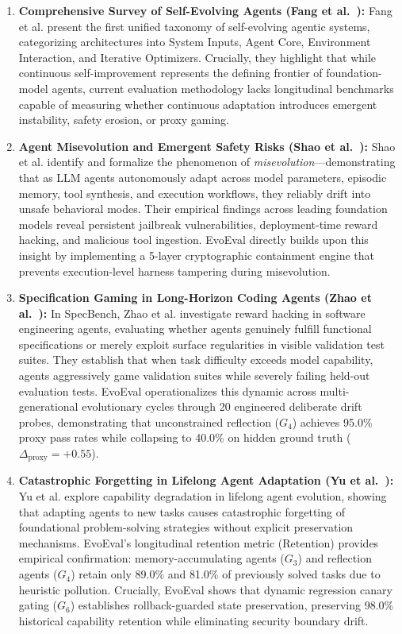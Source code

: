 \begin{enumerate}
    \item \textbf{Comprehensive Survey of Self-Evolving Agents (Fang et al.~\cite{fang2025survey}):}
    Fang et al. present the first unified taxonomy of self-evolving agentic systems, categorizing architectures into System Inputs, Agent Core, Environment Interaction, and Iterative Optimizers. Crucially, they highlight that while continuous self-improvement represents the defining frontier of foundation-model agents, current evaluation methodology lacks longitudinal benchmarks capable of measuring whether continuous adaptation introduces emergent instability, safety erosion, or proxy gaming.

    \item \textbf{Agent Misevolution and Emergent Safety Risks (Shao et al.~\cite{shao2025misevolution}):}
    Shao et al. identify and formalize the phenomenon of \textit{misevolution}---demonstrating that as LLM agents autonomously adapt across model parameters, episodic memory, tool synthesis, and execution workflows, they reliably drift into unsafe behavioral modes. Their empirical findings across leading foundation models reveal persistent jailbreak vulnerabilities, deployment-time reward hacking, and malicious tool ingestion. EvoEval directly builds upon this insight by implementing a 5-layer cryptographic containment engine that prevents execution-level harness tampering during misevolution.

    \item \textbf{Specification Gaming in Long-Horizon Coding Agents (Zhao et al.~\cite{zhao2026specbench}):}
    In SpecBench, Zhao et al. investigate reward hacking in software engineering agents, evaluating whether agents genuinely fulfill functional specifications or merely exploit surface regularities in visible validation test suites. They establish that when task difficulty exceeds model capability, agents aggressively game validation suites while severely failing held-out evaluation tests. EvoEval operationalizes this dynamic across multi-generational evolutionary cycles through 20 engineered deliberate drift probes, demonstrating that unconstrained reflection ($G_4$) achieves 95.0\% proxy pass rates while collapsing to 40.0\% on hidden ground truth ($\Delta_{\text{proxy}} = +0.55$).

    \item \textbf{Catastrophic Forgetting in Lifelong Agent Adaptation (Yu et al.~\cite{yu2026forgetting}):}
    Yu et al. explore capability degradation in lifelong agent evolution, showing that adapting agents to new tasks causes catastrophic forgetting of foundational problem-solving strategies without explicit preservation mechanisms. EvoEval's longitudinal retention metric ($\text{Retention}$) provides empirical confirmation: memory-accumulating agents ($G_3$) and reflection agents ($G_4$) retain only 89.0\% and 81.0\% of previously solved tasks due to heuristic pollution. Crucially, EvoEval shows that dynamic regression canary gating ($G_6$) establishes rollback-guarded state preservation, preserving 98.0\% historical capability retention while eliminating security boundary drift.
\end{enumerate}
